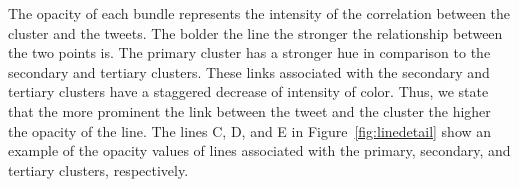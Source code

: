 The opacity of each bundle represents the intensity of the correlation between the cluster and the tweets. The bolder the line the stronger the relationship between the two points is. The primary cluster has a stronger hue in comparison to the secondary and tertiary clusters. These links associated with the secondary and tertiary clusters have a staggered decrease of intensity of color. Thus, we state that the more prominent the link between the tweet and the cluster the higher the opacity of the line. The lines C, D, and E in Figure~\ref{fig:linedetail} show an example of the opacity values of lines associated with the primary, secondary, and tertiary clusters, respectively.


